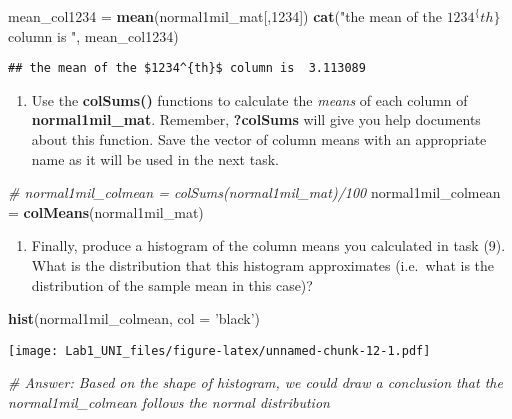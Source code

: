 \documentclass[]{article}
\newenvironment{Shaded}{\begin{snugshade}}{\end{snugshade}}
\newcommand{\KeywordTok}[1]{\textcolor[rgb]{0.13,0.29,0.53}{\textbf{#1}}}
\newcommand{\DataTypeTok}[1]{\textcolor[rgb]{0.13,0.29,0.53}{#1}}
\newcommand{\DecValTok}[1]{\textcolor[rgb]{0.00,0.00,0.81}{#1}}
\newcommand{\StringTok}[1]{\textcolor[rgb]{0.31,0.60,0.02}{#1}}
\newcommand{\CommentTok}[1]{\textcolor[rgb]{0.56,0.35,0.01}{\textit{#1}}}
\newcommand{\NormalTok}[1]{#1}
\providecommand{\tightlist}{%
  \setlength{\itemsep}{0pt}\setlength{\parskip}{0pt}}
\begin{document}
\begin{Shaded}
\begin{Highlighting}[]
\NormalTok{mean_col1234 =}\StringTok{ }\KeywordTok{mean}\NormalTok{(normal1mil_mat[,}\DecValTok{1234}\NormalTok{])}
\KeywordTok{cat}\NormalTok{(}\StringTok{"the mean of the $1234^\{th\}$ column is "}\NormalTok{, mean_col1234)}
\end{Highlighting}
\end{Shaded}

\begin{verbatim}
## the mean of the $1234^{th}$ column is  3.113089
\end{verbatim}

\begin{enumerate}
\def\labelenumi{\arabic{enumi})}
\setcounter{enumi}{8}
\tightlist
\item
  Use the \textbf{colSums()} functions to calculate the \emph{means} of
  each column of \textbf{normal1mil\_mat}. Remember, \textbf{?colSums}
  will give you help documents about this function. Save the vector of
  column means with an appropriate name as it will be used in the next
  task.
\end{enumerate}

\begin{Shaded}
\begin{Highlighting}[]
\CommentTok{# normal1mil_colmean = colSums(normal1mil_mat)/100}
\NormalTok{normal1mil_colmean =}\StringTok{ }\KeywordTok{colMeans}\NormalTok{(normal1mil_mat)}
\end{Highlighting}
\end{Shaded}

\begin{enumerate}
\def\labelenumi{\arabic{enumi})}
\setcounter{enumi}{9}
\tightlist
\item
  Finally, produce a histogram of the column means you calculated in
  task (9). What is the distribution that this histogram approximates
  (i.e.~what is the distribution of the sample mean in this case)?
\end{enumerate}

\begin{Shaded}
\begin{Highlighting}[]
\KeywordTok{hist}\NormalTok{(normal1mil_colmean, }\DataTypeTok{col =} \StringTok{'black'}\NormalTok{)}
\end{Highlighting}
\end{Shaded}

\texttt{[image: Lab1\_UNI\_files/figure-latex/unnamed-chunk-12-1.pdf]}

\begin{Shaded}
\begin{Highlighting}[]
\CommentTok{# Answer: Based on the shape of histogram, we could draw a conclusion that the normal1mil_colmean follows the normal distribution}
\end{Highlighting}
\end{Shaded}
\end{document}
